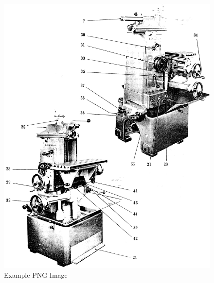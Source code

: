 \newpage
\begin{figure}[h]
    \centering
    \includegraphics[width=1.0\linewidth]{images/page_18}
    \caption{Example PNG Image}
    \label{fig:speeds_and_feeds_controls}
\end{figure}
